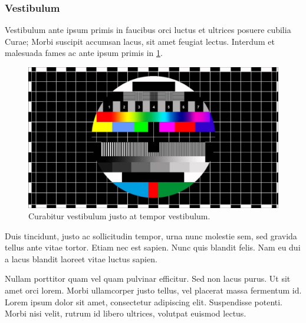 \subsubsection{Vestibulum}\label{subsubsec:Vestibulum}
Vestibulum ante ipsum primis in faucibus orci luctus et ultrices posuere cubilia Curae; Morbi suscipit accumsan lacus, sit amet feugiat lectus. Interdum et malesuada fames ac ante ipsum primis in \ref{fig:TestImage}. 

\begin{figure}[htbp]
\centering
\includegraphics[scale=0.3]{Abbildungen/TestImage.jpg}
\caption{Curabitur vestibulum justo at tempor vestibulum.}
\label{fig:TestImage}
\end{figure}

Duis tincidunt, justo ac sollicitudin tempor, urna nunc molestie sem, sed gravida tellus ante vitae tortor. Etiam nec est sapien. Nunc quis blandit felis. Nam eu dui a lacus blandit laoreet vitae luctus sapien. 

Nullam porttitor quam vel quam pulvinar efficitur. Sed non lacus purus. Ut sit amet orci lorem. Morbi ullamcorper justo tellus, vel placerat massa fermentum id. Lorem ipsum dolor sit amet, consectetur adipiscing elit. Suspendisse potenti. Morbi nisi velit, rutrum id libero ultrices, volutpat euismod lectus.\cite[S. 1030]{Morbiac.20.02.1500}